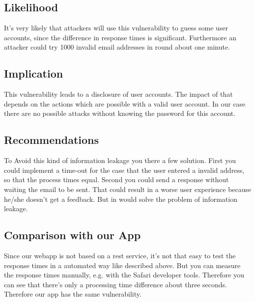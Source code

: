 \subsection{Likelihood}
It's very likely that attackers will use this vulnerability to guess some user accounts, since the difference in response times is significant. Furthermore an attacker could try 1000 invalid email addresses in round about one minute. 

\subsection{Implication} 
This vulnerability leads to a disclosure of user accounts. The impact of that depends on the actions which are possible with a valid user account. In our case there are no possible attacks without knowing the password for this account.


\subsection{Recommendations}
To Avoid this kind of information leakage you there a few solution. First you could implement a time-out for the case that the user entered a invalid address, so that the process times equal. Second you could send a response without waiting the email to be sent.
That could result in a worse user experience because he/she doesn't get a feedback. But in would solve the problem of information leakage.

\subsection{Comparison with our App}
Since our webapp is not based on a rest service, it's not that easy to test the response times in a automated way like described above. But you can measure the response times manually, e.g. with the Safari developer tools. Therefore you can see that there's only a processing time difference about three seconds. Therefore our app has the same vulnerability.

